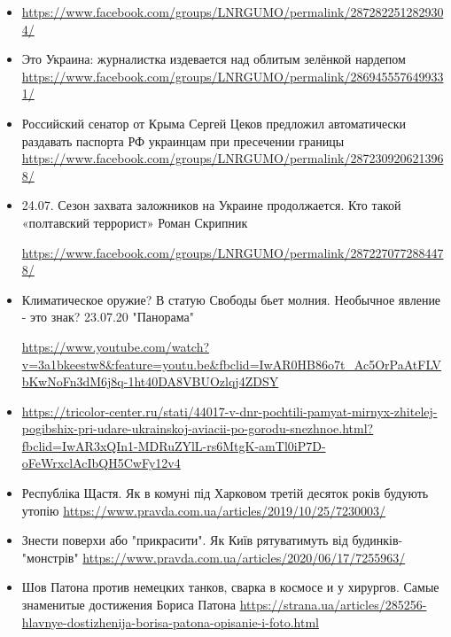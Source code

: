 \begin{itemize}
		\item 
			\url{https://www.facebook.com/groups/LNRGUMO/permalink/2872822512829304/}

		\item Это Украина: журналистка издевается над облитым зелёнкой нардепом
						\url{https://www.facebook.com/groups/LNRGUMO/permalink/2869455576499331/}

		\item Российский сенатор от Крыма Сергей Цеков предложил автоматически
						раздавать паспорта РФ украинцам при пресечении границы
								\url{https://www.facebook.com/groups/LNRGUMO/permalink/2872309206213968/}

		\item 24.07. Сезон захвата заложников на Украине продолжается. Кто такой
						«полтавский террорист» Роман Скрипник

						\url{https://www.facebook.com/groups/LNRGUMO/permalink/2872270772884478/}

		\item Климатическое оружие? В статую Свободы бьет молния. Необычное явление
						- это знак? 23.07.20 "Панорама"

						\url{https://www.youtube.com/watch?v=3a1bkeestw8&feature=youtu.be&fbclid=IwAR0HB86o7t_Ac5OrPaAtFLVbKwNoFn3dM6j8q-1ht40DA8VBUOzlqj4ZDSY}

		\item
						\url{https://tricolor-center.ru/stati/44017-v-dnr-pochtili-pamyat-mirnyx-zhitelej-pogibshix-pri-udare-ukrainskoj-aviacii-po-gorodu-snezhnoe.html?fbclid=IwAR3xQIn1-MDRuZYlL-rs6MtgK-amTl0iP7D-oFeWrxclAcIbQH5CwFy12v4}

		\item Республіка Щастя. Як в комуні під Харковом третій десяток років будують утопію
						\url{https://www.pravda.com.ua/articles/2019/10/25/7230003/}

		\item Знести поверхи або "прикрасити". Як Київ рятуватимуть від будинків-"монстрів"
						\url{https://www.pravda.com.ua/articles/2020/06/17/7255963/}

		\item Шов Патона против немецких танков, сварка в космосе и у хирургов.
						Самые знаменитые достижения Бориса Патона
		\url{https://strana.ua/articles/285256-hlavnye-dostizhenija-borisa-patona-opisanie-i-foto.html}
\end{itemize}

